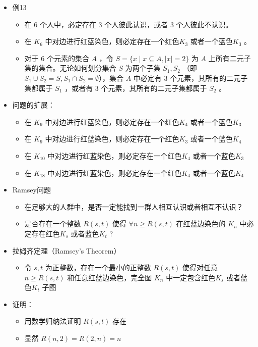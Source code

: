 \documentclass[UTF8]{report}
\theoremstyle{MyLineTheoremStyle} %
\theoremstyle{MyBlockTheoremStyle} %
\theoremstyle{MySubsubsectionStyle} %
\begin{document}
\begin{itemize}
    \item 例13
    \begin{itemize}
        \item 在 6 个人中，必定存在 3 个人彼此认识，或者 3 个人彼此不认识。
        \item 在 $K_6$ 中对边进行红蓝染色，则必定存在一个红色$K_3$ 或者一个蓝色$K_3$ 。
        \item 对于 6 个元素的集合 $A$ ，令 $S = \{x \mid x \subseteq A, |x| = 2\}$ 为 $A$ 上所有二元子集的集合。无论如何划分集合 $S$ 为两个子集 $S_1, S_2$ （即 $S_1 \cup S_2 = S, S_1 \cap S_2 = \emptyset$），集合 $A$ 中必定有 3 个元素，其所有的二元子集都属于 $S_1$ ，或者有 3 个元素，其所有的二元子集都属于 $S_2$ 。
    \end{itemize}
    \item 问题的扩展：
    \begin{itemize}
        \item 在 $K_9$ 中对边进行红蓝染色，则必定存在一个红色$K_4$ 或者一个蓝色$K_3$
        \item 在 $K_9$ 中对边进行红蓝染色，则必定存在一个红色$K_3$ 或者一个蓝色$K_4$
        \item 在 $K_{10}$ 中对边进行红蓝染色，则必定存在一个红色$K_4$ 或者一个蓝色$K_3$
        \item 在 $K_{18}$ 中对边进行红蓝染色，则必定存在一个红色$K_4$ 或者一个蓝色$K_4$
    \end{itemize}
    \item Ramsey问题
    \begin{itemize}
        \item 在足够大的人群中，是否一定能找到一群人相互认识或者相互不认识？
        \item 是否存在一个整数 $R(s,t)$ 使得 $\forall n \geq R(s,t)$ 在红蓝边染色的 $K_n$ 中必定存在红色$K_s$ 或者蓝色$K_t$ ?
    \end{itemize}
    \item 拉姆齐定理（Ramsey’s Theorem）
    \begin{itemize}
        \item 令 $s,t$ 为正整数，存在一个最小的正整数 $R(s,t)$ 使得对任意 $n \geq R(s,t)$ 和任意红蓝边染色，完全图 $K_n$ 中一定包含红色$K_s$ 或者蓝色$K_t$ 子图
    \end{itemize}
    \item 证明：
    \begin{itemize}
        \item 用数学归纳法证明 $R(s,t)$ 存在
        \item 显然 $R(n, 2) = R(2, n) = n$

\end{itemize}
\end{itemize}
\end{document}
